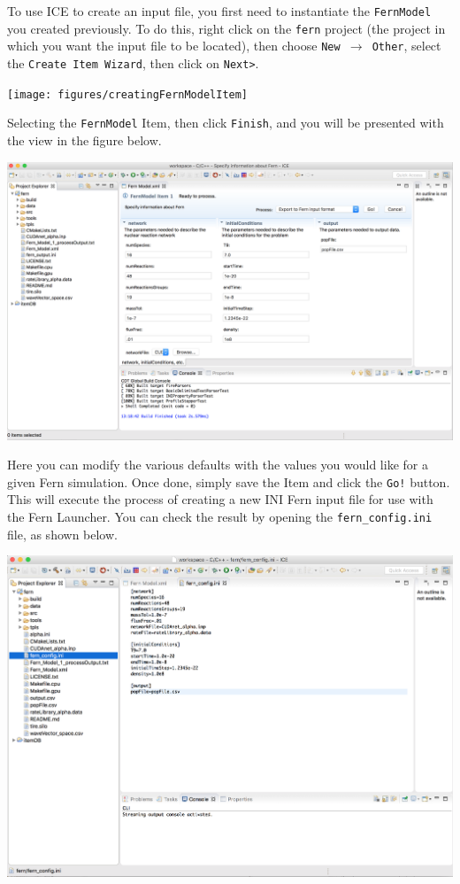 To use ICE to create an input file, you first need to instantiate the
\texttt{FernModel} you created previously. To do this, right click on the
\texttt{fern} project (the project in which you want the input file to be
located), then choose \texttt{New $\rightarrow$ Other},  select the
\texttt{Create Item Wizard}, then click on \texttt{Next>}.
\begin{center} \texttt{[image: figures/creatingFernModelItem]}
\end{center}
Selecting the \texttt{FernModel} Item, then click \texttt{Finish}, and you will
be presented with the view in the figure below. 
\begin{center} \includegraphics[width=\textwidth]{figures/fernmodelItem}
\end{center}
Here you can modify the various defaults with the values you would like for a
given Fern simulation. Once done, simply save the Item and click the
\texttt{Go!} button. This will execute the process of creating a new INI Fern
input file for use with the Fern Launcher. You can check the result by opening
the \texttt{fern\_config.ini} file, as shown below.
\begin{center} \includegraphics[width=\textwidth]{figures/result}
\end{center}

